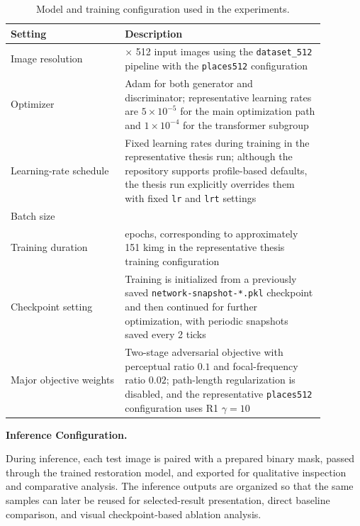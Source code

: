 \documentclass[12pt, twoside]{report}
\begin{document}
\begin{table}[H]
\centering
\caption{Model and training configuration used in the experiments.}
\label{tab:train_config}
\begin{tabular}{>{\raggedright\arraybackslash}p{0.32\linewidth} >{\raggedright\arraybackslash}p{0.56\linewidth}}
\toprule
\textbf{Setting} & \textbf{Description} \\
\midrule
Image resolution & 512 $\times$ 512 input images using the \texttt{dataset\_512} pipeline with the \texttt{places512} configuration \\
Optimizer & Adam for both generator and discriminator; representative learning rates are $5\times10^{-5}$ for the main optimization path and $1\times10^{-4}$ for the transformer subgroup \\
Learning-rate schedule & Fixed learning rates during training in the representative thesis run; although the repository supports profile-based defaults, the thesis run explicitly overrides them with fixed \texttt{lr} and \texttt{lrt} settings \\
Batch size & 4 \\
Training duration & 40 epochs, corresponding to approximately 151 kimg in the representative thesis training configuration \\
Checkpoint setting & Training is initialized from a previously saved \texttt{network-snapshot-*.pkl} checkpoint and then continued for further optimization, with periodic snapshots saved every 2 ticks \\
Major objective weights & Two-stage adversarial objective with perceptual ratio $0.1$ and focal-frequency ratio $0.02$; path-length regularization is disabled, and the representative \texttt{places512} configuration uses R1 $\gamma = 10$ \\
\bottomrule
\end{tabular}
\end{table}

\vspace{0.35\baselineskip}
\noindent\textbf{Inference Configuration.}\par

During inference, each test image is paired with a prepared binary mask, passed through the trained restoration model, and exported for qualitative inspection and comparative analysis. The inference outputs are organized so that the same samples can later be reused for selected-result presentation, direct baseline comparison, and visual checkpoint-based ablation analysis.
\end{document}

